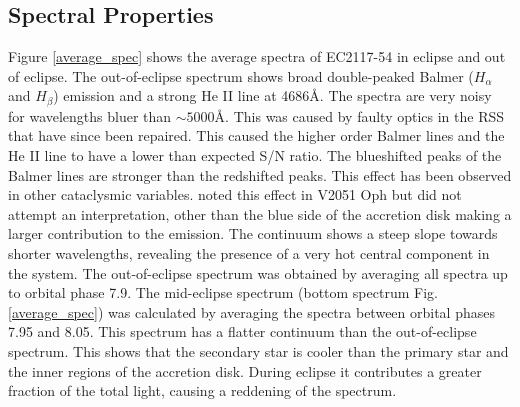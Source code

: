 



\subsection{Spectral Properties}
\label{spectral_prop}

Figure \ref{average_spec} shows the average spectra of EC2117-54 in eclipse and out of eclipse. The out-of-eclipse spectrum shows broad double-peaked Balmer ($H_{\alpha}$ and $H_{\beta}$) emission and a strong He II line at 4686\AA{}. The spectra are very noisy for wavelengths bluer than $\sim5000$\AA{}. This was caused by faulty optics in the RSS that have since been repaired. This caused the higher order Balmer lines and the He II line to have a lower than expected S/N ratio. The blueshifted peaks of the Balmer lines are stronger than the redshifted peaks. This effect has been observed in other cataclysmic variables. \cite{V2051Oph2001} noted this effect in V2051 Oph but did not attempt an interpretation, other than the blue side of the accretion disk making a larger contribution to the emission. The continuum shows a steep slope towards shorter wavelengths, revealing the presence of a very hot central component in the system. The out-of-eclipse spectrum was obtained by averaging all spectra up to orbital phase 7.9.  The mid-eclipse spectrum (bottom spectrum Fig. \ref{average_spec}) was calculated by averaging the spectra between orbital phases 7.95 and 8.05. This spectrum has a flatter continuum than the out-of-eclipse spectrum.  This shows that the secondary star is cooler than the primary star and the inner regions of the accretion disk. During eclipse it contributes a greater fraction of the total light, causing a reddening of the spectrum.











